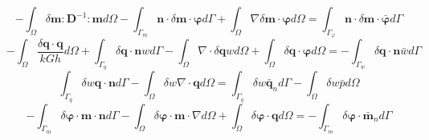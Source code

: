 \begin{equation}
-\int_{\Omega} \delta \boldsymbol m : \boldsymbol D^{-1}: \boldsymbol m d\Omega - \int_{\Gamma_{m}} \boldsymbol n \cdot \delta \boldsymbol m \cdot \boldsymbol \varphi d\Gamma + \int_{\Omega} \nabla \delta \boldsymbol m \cdot \boldsymbol  \varphi d\Omega = \int_{\Gamma_{\varphi}} \boldsymbol n \cdot \delta \boldsymbol m\cdot \bar{\boldsymbol \varphi} d\Gamma
\end{equation}
\begin{equation}
- \int_{\Omega} \frac{\delta \boldsymbol q\cdot \boldsymbol q}{kGh} d\Omega + \int_{\Gamma_{q}} \delta \boldsymbol q\cdot \boldsymbol n w d\Gamma - \int_{\Omega}\nabla \cdot \delta \boldsymbol q w d\Omega + \int_{\Omega}\delta \boldsymbol q\cdot \boldsymbol \varphi d\Omega = - \int_{\Gamma_{w}} \delta \boldsymbol q\cdot \boldsymbol n \bar{w} d\Gamma
\end{equation}
\begin{equation}
\int_{\Gamma_q} \delta w \boldsymbol q\cdot \boldsymbol n d\Gamma - \int_\Omega \delta w \nabla \cdot \boldsymbol q d\Omega = \int_{\Gamma_q}\delta w \bar{\boldsymbol q}_n d\Gamma - \int_\Omega \delta w \bar p d\Omega
\end{equation}
\begin{equation}
- \int_{\Gamma_m} \delta \boldsymbol \varphi \cdot \boldsymbol m \cdot \boldsymbol n d\Gamma - \int_\Omega \delta \boldsymbol \varphi \cdot \boldsymbol m \cdot \nabla d\Omega + \int_\Omega \delta \boldsymbol \varphi \cdot \boldsymbol q d\Omega = - \int_{\Gamma_m} \delta \boldsymbol \varphi \cdot \bar{\boldsymbol m}_n d\Gamma
\end{equation}


